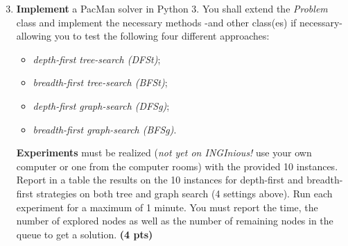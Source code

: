 \documentclass[11pt,a4paper]{../template/report}
\begin{document}
\begin{enumerate}
\setcounter{enumi}{2}
    \item \textbf{Implement} a PacMan solver in Python 3.
			You shall extend the \emph{Problem} class and implement the necessary methods -and other class(es) if necessary- allowing you to test the following four different approaches: 
			\begin{itemize}
			\item \textit{depth-first tree-search (DFSt)};
			\item \textit{breadth-first tree-search (BFSt)};
			\item \textit{depth-first graph-search (DFSg)};
			\item \textit{breadth-first graph-search (BFSg)}. 
			\end{itemize}

    \textbf{Experiments} must be realized (\textit{not yet on INGInious!} use your own computer or one from the computer rooms) with the provided 10 instances. Report in a table the results on the 10 instances for depth-first and breadth-first strategies on both tree and graph search (4 settings above). Run each experiment for a maximum of 1 minute. You must report the time, the number of explored nodes as well as the number of remaining nodes in the queue to get a solution. \textbf{(4 pts)}
\end{enumerate}
\end{document}
